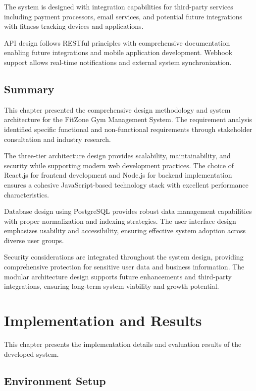 \documentclass[12pt,a4paper]{report}
\begin{document}
The system is designed with integration capabilities for third-party services including payment processors, email services, and potential future integrations with fitness tracking devices and applications.

API design follows RESTful principles with comprehensive documentation enabling future integrations and mobile application development. Webhook support allows real-time notifications and external system synchronization.

\section{Summary}
\label{sec:design-summary}

This chapter presented the comprehensive design methodology and system architecture for the FitZone Gym Management System. The requirement analysis identified specific functional and non-functional requirements through stakeholder consultation and industry research.

The three-tier architecture design provides scalability, maintainability, and security while supporting modern web development practices. The choice of React.js for frontend development and Node.js for backend implementation ensures a cohesive JavaScript-based technology stack with excellent performance characteristics.

Database design using PostgreSQL provides robust data management capabilities with proper normalization and indexing strategies. The user interface design emphasizes usability and accessibility, ensuring effective system adoption across diverse user groups.

Security considerations are integrated throughout the system design, providing comprehensive protection for sensitive user data and business information. The modular architecture design supports future enhancements and third-party integrations, ensuring long-term system viability and growth potential.

\chapter{Implementation and Results}
\label{ch:implementation-results}

This chapter presents the implementation details and evaluation results of the developed system.

\section{Environment Setup}
\label{sec:environment-setup}
\end{document}
